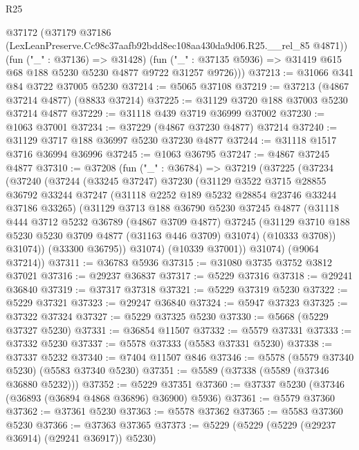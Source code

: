 \begin{lexlean}{R25}
\begin{coremodule}
      @37172
        (@37179 @37186 (LexLeanPreserve.Cc98c37aafb92bdd8ec108aa430da9d06.R25.__rel_85 @4871))
        (fun ("_" : @37136) => @31428)
        (fun ("_" : @37135 @5936) => @31419 @615 @68 @188 @5230 @5230 @4877 @9722 @31257 @9726)))
@37213 := @31066 @341 @84 @3722 @37005 @5230
@37214 := @5065 @37108
@37219 := @37213 (@4867 @37214 @4877) (@8833 @37214)
@37225 := @31129 @3720 @188 @37003 @5230 @37214 @4877
@37229 := @31118 @439 @3719 @36999 @37002
@37230 := @1063 @37001
@37234 := @37229 (@4867 @37230 @4877) @37214
@37240 := @31129 @3717 @188 @36997 @5230 @37230 @4877
@37244 := @31118 @1517 @3716 @36994 @36996
@37245 := @1063 @36795
@37247 := @4867 @37245 @4877
@37310 := @37208
    (fun ("_" : @36784) =>
    @37219
      (@37225
        (@37234
          (@37240
            (@37244
              (@33245 @37247)
              @37230
              (@31129
                @3522
                @3715
                @28855
                @36792
                @33244
                @37247
                (@31118 @2252 @189 @5232 @28854 @23746 @33244 @37186 @33265)
                (@31129
                  @3713
                  @188
                  @36790
                  @5230
                  @37245
                  @4877
                  (@31118
                    @444
                    @3712
                    @5232
                    @36789
                    (@4867 @3709 @4877)
                    @37245
                    (@31129 @3710 @188 @5230 @5230 @3709 @4877 (@31163 @446 @3709) @31074)
                    (@10333 @3708))
                  @31074))
              (@33300 @36795))
            @31074)
          (@10339 @37001))
        @31074)
      (@9064 @37214))
@37311 := @36783 @5936
@37315 := @31080 @3735 @3752 @3812 @37021
@37316 := @29237 @36837
@37317 := @5229 @37316
@37318 := @29241 @36840
@37319 := @37317 @37318
@37321 := @5229 @37319 @5230
@37322 := @5229 @37321
@37323 := @29247 @36840
@37324 := @5947 @37323
@37325 := @37322 @37324
@37327 := @5229 @37325 @5230
@37330 := @5668 (@5229 @37327 @5230)
@37331 := @36854 @11507
@37332 := @5579 @37331
@37333 := @37332 @5230
@37337 := @5578 @37333 (@5583 @37331 @5230)
@37338 := @37337 @5232
@37340 := @7404 @11507 @846
@37346 := @5578 (@5579 @37340 @5230) (@5583 @37340 @5230)
@37351 := @5589 (@37338 (@5589 (@37346 @36880 @5232)))
@37352 := @5229 @37351
@37360 := @37337 @5230 (@37346 (@36893 (@36894 @4868 @36896) @36900) @5936)
@37361 := @5579 @37360
@37362 := @37361 @5230
@37363 := @5578 @37362
@37365 := @5583 @37360 @5230
@37366 := @37363 @37365
@37373 := @5229 (@5229 (@5229 (@29237 @36914) (@29241 @36917)) @5230)

\end{coremodule}
\end{lexlean}
